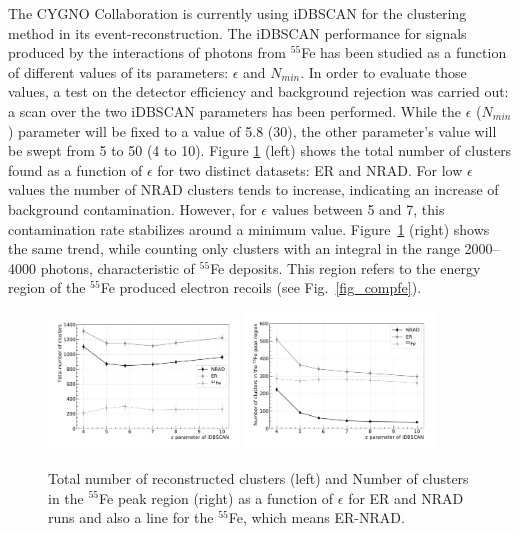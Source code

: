 \documentclass[a4paper,11pt]{article}
\begin{document}
The CYGNO Collaboration is currently using iDBSCAN for the clustering method in its event-reconstruction.
The iDBSCAN performance for signals produced by the interactions of photons from $^{55}$Fe has been studied as a function of different values of its parameters: $\epsilon$ and $N_{min}$.
In order to evaluate those values, a test on the detector efficiency and background rejection was carried out: a scan over the two iDBSCAN parameters has been performed.
While the $\epsilon$ ($N_{min}$) parameter will be fixed to a value of 5.8 (30), the other parameter's value will be swept from 5 to 50 (4 to 10). 
Figure \ref{fig:epsscan} (left) shows the total number of clusters found as a function of $\epsilon$ for two distinct datasets: ER and NRAD.
For low $\epsilon$ values the number of NRAD clusters tends to increase, indicating an increase of background contamination. However, for $\epsilon$ values between 5 and 7, this contamination rate stabilizes around a minimum value.
Figure~\ref{fig:epsscan} (right) shows the same trend, while counting only clusters with an integral in the range 2000–4000 photons, characteristic of $^{55}$Fe deposits. This region refers to the energy region of the $^{55}$Fe produced electron recoils (see Fig.~\ref{fig_compfe}).

\begin{figure}[ht]
\centering
\includegraphics[width=0.45\textwidth]{TotalEpsScan.pdf}
\includegraphics[width=0.45\textwidth]{SpotEpsScan.pdf}
\caption{Total number of reconstructed clusters (left) and Number of clusters in the $^{55}$Fe peak region (right) as a function of $\epsilon$ for ER and NRAD runs and also a line for the $^{55}$Fe, which means ER-NRAD.}
\label{fig:epsscan}
\end{figure}
\end{document}

